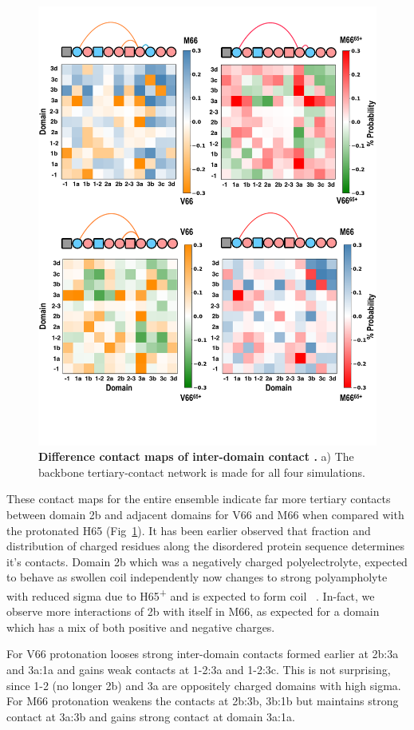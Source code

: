 \documentclass[journal=jacsat,manuscript=article]{achemso}
\begin{document}
\begin{figure}[!ht]
\includegraphics[scale=0.5,width=12cm,trim={0 0cm 0 0cm},clip]{../figures/fig4m2.pdf}
\caption{{\bf Difference contact maps of inter-domain contact .} a) The backbone tertiary-contact network is made for all four simulations.}
\label{fig4m2}
\end{figure}

These contact maps for the entire ensemble indicate far more tertiary contacts between domain 2b and adjacent domains for V66 and M66 when compared with the protonated H65 (Fig~\ref{fig4m2}).  It has been earlier observed that fraction and distribution of charged residues along the disordered protein sequence determines it's contacts. Domain 2b which was a negatively charged polyelectrolyte, expected to behave as swollen coil independently now changes to strong polyampholyte with reduced sigma due to H65\textsuperscript{+} and is expected to form coil ~\cite{Das2013a}. In-fact, we observe more interactions of 2b with itself in M66, as expected for a domain which has a mix of both positive and negative charges.

For V66 protonation looses strong inter-domain contacts formed earlier at 2b:3a and 3a:1a and gains weak contacts at 1-2:3a and 1-2:3c. This is not surprising, since 1-2 (no longer 2b) and 3a are oppositely charged domains with high sigma. 
For M66 protonation weakens the contacts at 2b:3b, 3b:1b but maintains strong contact at 3a:3b and gains strong contact at domain 3a:1a. 
\end{document}

